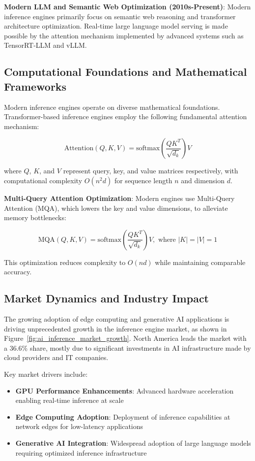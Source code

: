 \documentclass[12pt,a4paper]{article}
\begin{document}
\textbf{Modern LLM and Semantic Web Optimization (2010s-Present)}: Modern inference engines primarily focus on semantic web reasoning and transformer architecture optimization. Real-time large language model serving is made possible by the attention mechanism implemented by advanced systems such as TensorRT-LLM and vLLM.

\subsection{Computational Foundations and Mathematical Frameworks}
Modern inference engines operate on diverse mathematical foundations. Transformer-based inference engines employ the following fundamental attention mechanism:

\begin{equation}
\text{Attention}(Q,K,V) = \text{softmax}\left(\frac{QK^T}{\sqrt{d_k}}\right)V
\end{equation}

where $Q$, $K$, and $V$ represent query, key, and value matrices respectively, with computational complexity $O(n^2d)$ for sequence length $n$ and dimension $d$.

\textbf{Multi-Query Attention Optimization}: Modern engines use Multi-Query Attention (MQA), which lowers the key and value dimensions, to alleviate memory bottlenecks:

\begin{equation}
\text{MQA}(Q,K,V) = \text{softmax}\left(\frac{QK^T}{\sqrt{d_k}}\right)V, \text{ where } |K|=|V|=1
\end{equation}

This optimization reduces complexity to $O(nd)$ while maintaining comparable accuracy.

\subsection{Market Dynamics and Industry Impact}
The growing adoption of edge computing and generative AI applications is driving unprecedented growth in the inference engine market, as shown in Figure~\ref{fig:ai_inference_market_growth}. North America leads the market with a 36.6\% share, mostly due to significant investments in AI infrastructure made by cloud providers and IT companies.

Key market drivers include:
\begin{itemize}
    \item \textbf{GPU Performance Enhancements}: Advanced hardware acceleration enabling real-time inference at scale
    \item \textbf{Edge Computing Adoption}: Deployment of inference capabilities at network edges for low-latency applications
    \item \textbf{Generative AI Integration}: Widespread adoption of large language models requiring optimized inference infrastructure
\end{itemize}
\end{document}
